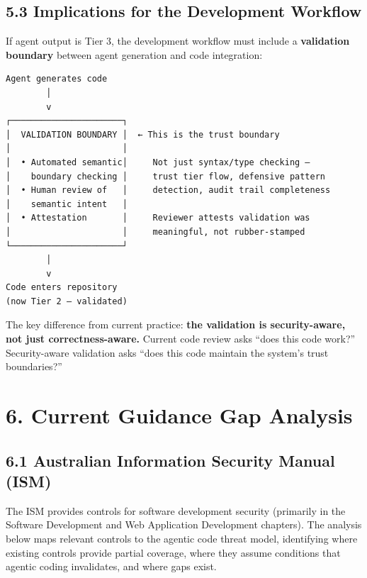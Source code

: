 \documentclass[a4paper,11pt]{report}
\begin{document}
\hypertarget{implications-for-the-development-workflow}{%
\subsection{5.3 Implications for the Development
Workflow}\label{implications-for-the-development-workflow}}

If agent output is Tier 3, the development workflow must include a
\textbf{validation boundary} between agent generation and code
integration:

\begin{center}
\begin{BVerbatim}
Agent generates code
        │
        v
┌──────────────────────┐
│  VALIDATION BOUNDARY │  ← This is the trust boundary
│                      │
│  • Automated semantic│     Not just syntax/type checking —
│    boundary checking │     trust tier flow, defensive pattern
│  • Human review of   │     detection, audit trail completeness
│    semantic intent   │
│  • Attestation       │     Reviewer attests validation was
│                      │     meaningful, not rubber-stamped
└──────────────────────┘
        │
        v
Code enters repository
(now Tier 2 — validated)
\end{BVerbatim}
\end{center}

The key difference from current practice: \textbf{the validation is
security-aware, not just correctness-aware.} Current code review asks
``does this code work?'' Security-aware validation asks ``does this code
maintain the system's trust boundaries?''

\hypertarget{current-guidance-gap-analysis}{%
\section{6. Current Guidance Gap
Analysis}\label{current-guidance-gap-analysis}}

\hypertarget{australian-information-security-manual-ism}{%
\subsection{6.1 Australian Information Security Manual
(ISM)}\label{australian-information-security-manual-ism}}

The ISM provides controls for software development security (primarily
in the Software Development and Web Application Development chapters).
The analysis below maps relevant controls to the agentic code threat
model, identifying where existing controls provide partial coverage,
where they assume conditions that agentic coding invalidates, and where
gaps exist.
\end{document}
